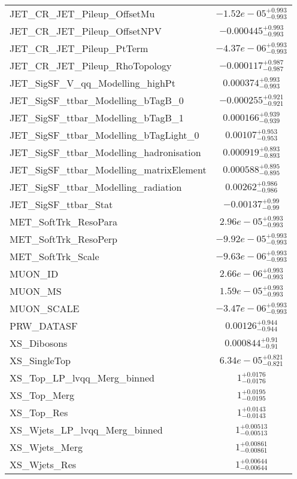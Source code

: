 \begin{tabular}{|l|c|}
JET\_CR\_JET\_Pileup\_OffsetMu & $-1.52e-05^{+0.993}_{-0.993}$ \\
JET\_CR\_JET\_Pileup\_OffsetNPV & $-0.000445^{+0.993}_{-0.993}$ \\
JET\_CR\_JET\_Pileup\_PtTerm & $-4.37e-06^{+0.993}_{-0.993}$ \\
JET\_CR\_JET\_Pileup\_RhoTopology & $-0.000117^{+0.987}_{-0.987}$ \\
JET\_SigSF\_V\_qq\_Modelling\_highPt & $0.000374^{+0.993}_{-0.993}$ \\
JET\_SigSF\_ttbar\_Modelling\_bTagB\_0 & $-0.000255^{+0.921}_{-0.921}$ \\
JET\_SigSF\_ttbar\_Modelling\_bTagB\_1 & $0.000166^{+0.939}_{-0.939}$ \\
JET\_SigSF\_ttbar\_Modelling\_bTagLight\_0 & $0.00107^{+0.953}_{-0.953}$ \\
JET\_SigSF\_ttbar\_Modelling\_hadronisation & $0.000919^{+0.893}_{-0.893}$ \\
JET\_SigSF\_ttbar\_Modelling\_matrixElement & $0.000588^{+0.895}_{-0.895}$ \\
JET\_SigSF\_ttbar\_Modelling\_radiation & $0.00262^{+0.986}_{-0.986}$ \\
JET\_SigSF\_ttbar\_Stat & $-0.00137^{+0.99}_{-0.99}$ \\
MET\_SoftTrk\_ResoPara & $2.96e-05^{+0.993}_{-0.993}$ \\
MET\_SoftTrk\_ResoPerp & $-9.92e-05^{+0.993}_{-0.993}$ \\
MET\_SoftTrk\_Scale & $-9.63e-06^{+0.993}_{-0.993}$ \\
MUON\_ID & $2.66e-06^{+0.993}_{-0.993}$ \\
MUON\_MS & $1.59e-05^{+0.993}_{-0.993}$ \\
MUON\_SCALE & $-3.47e-06^{+0.993}_{-0.993}$ \\
PRW\_DATASF & $0.00126^{+0.944}_{-0.944}$ \\
XS\_Dibosons & $0.000844^{+0.91}_{-0.91}$ \\
XS\_SingleTop & $6.34e-05^{+0.821}_{-0.821}$ \\
XS\_Top\_LP\_lvqq\_Merg\_binned & $1^{+0.0176}_{-0.0176}$ \\
XS\_Top\_Merg & $1^{+0.0195}_{-0.0195}$ \\
XS\_Top\_Res & $1^{+0.0143}_{-0.0143}$ \\
XS\_Wjets\_LP\_lvqq\_Merg\_binned & $1^{+0.00513}_{-0.00513}$ \\
XS\_Wjets\_Merg & $1^{+0.00861}_{-0.00861}$ \\
XS\_Wjets\_Res & $1^{+0.00644}_{-0.00644}$ \\

\end{tabular}
